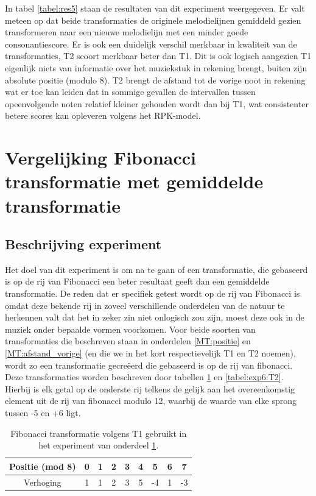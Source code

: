In tabel \ref{tabel:res5} staan de resultaten van dit experiment weergegeven. Er valt meteen op dat beide transformaties de originele melodielijnen gemiddeld gezien transformeren naar een nieuwe melodielijn met een minder goede consonantiescore. Er is ook een duidelijk verschil merkbaar in kwaliteit van de transformaties, T2 scoort merkbaar beter dan T1. Dit is ook logisch aangezien T1 eigenlijk niets van informatie over het muziekstuk in rekening brengt, buiten zijn absolute positie (modulo 8). T2 brengt de afstand tot de vorige noot in rekening wat er toe kan leiden dat in sommige gevallen de intervallen tussen opeenvolgende noten relatief kleiner gehouden wordt dan bij T1, wat consistenter betere scores kan opleveren volgens het RPK-model.

\section{Vergelijking Fibonacci transformatie met gemiddelde transformatie}
\label{experiment:6}
\subsection{Beschrijving experiment}
Het doel van dit experiment is om na te gaan of een transformatie, die gebaseerd is op de rij van Fibonacci een beter resultaat geeft dan een gemiddelde transformatie. De reden dat er specifiek getest wordt op de rij van Fibonacci is omdat deze bekende rij in zoveel verschillende onderdelen van de natuur te herkennen valt dat het in zeker zin niet onlogisch zou zijn, moest deze ook in de muziek onder bepaalde vormen voorkomen. Voor beide soorten van transformaties die beschreven staan in onderdelen \ref{MT:positie} en \ref{MT:afstand_vorige} (en die we in het kort respectievelijk T1 en T2 noemen), wordt zo een transformatie gecre\"eerd die gebaseerd is op de rij van fibonacci. Deze transformaties worden beschreven door tabellen \ref{tabel:exp6:T1} en \ref{tabel:exp6:T2}. Hierbij is elk getal op de onderste rij telkens de gelijk aan het overeenkomstig element uit de rij van fibonacci modulo 12, waarbij de waarde van elke sprong tussen -5 en +6 ligt.

\begin{table}
  \centering
  \begin{tabular}{c | c c c c c c c c }
    Positie (mod 8) & 0 & 1 & 2 & 3 & 4 & 5 & 6 & 7 \\
    \hline
    \hline
    Verhoging & 1 & 1 & 2 & 3 & 5 & -4 & 1 & -3 \\
  \end{tabular}
  \caption{Fibonacci transformatie volgens T1 gebruikt in het experiment van onderdeel \ref{experiment:6}.}
  \label{tabel:exp6:T1}
\end{table}

